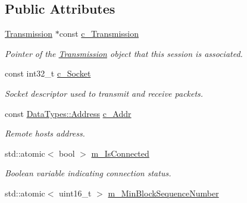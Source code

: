 \subsection*{Public Attributes}
\begin{DoxyCompactItemize}
\item 
\hyperlink{class_network_coding_1_1_transmission}{Transmission} $\ast$const \hyperlink{class_network_coding_1_1_transmission_session_a76808b9fb4d31f1c471ef313e50aff54}{c\+\_\+\+Transmission}\hypertarget{class_network_coding_1_1_transmission_session_a76808b9fb4d31f1c471ef313e50aff54}{}\label{class_network_coding_1_1_transmission_session_a76808b9fb4d31f1c471ef313e50aff54}

\begin{DoxyCompactList}\small\item\em Pointer of the \hyperlink{class_network_coding_1_1_transmission}{Transmission} object that this session is associated. \end{DoxyCompactList}\item 
const int32\+\_\+t \hyperlink{class_network_coding_1_1_transmission_session_a9d0373f0889c3f9ed0cead43c8cfefa9}{c\+\_\+\+Socket}\hypertarget{class_network_coding_1_1_transmission_session_a9d0373f0889c3f9ed0cead43c8cfefa9}{}\label{class_network_coding_1_1_transmission_session_a9d0373f0889c3f9ed0cead43c8cfefa9}

\begin{DoxyCompactList}\small\item\em Socket descriptor used to transmit and receive packets. \end{DoxyCompactList}\item 
const \hyperlink{class_network_coding_1_1_data_types_1_1_address}{Data\+Types\+::\+Address} \hyperlink{class_network_coding_1_1_transmission_session_a7ab84397c986b771ff4332746d9d948a}{c\+\_\+\+Addr}
\begin{DoxyCompactList}\small\item\em Remote host\textquotesingle{}s address. \end{DoxyCompactList}\item 
std\+::atomic$<$ bool $>$ \hyperlink{class_network_coding_1_1_transmission_session_aa12eab14f68b6e4dc5e2de25ff017282}{m\+\_\+\+Is\+Connected}\hypertarget{class_network_coding_1_1_transmission_session_aa12eab14f68b6e4dc5e2de25ff017282}{}\label{class_network_coding_1_1_transmission_session_aa12eab14f68b6e4dc5e2de25ff017282}

\begin{DoxyCompactList}\small\item\em Boolean variable indicating connection status. \end{DoxyCompactList}\item 
std\+::atomic$<$ uint16\+\_\+t $>$ \hyperlink{class_network_coding_1_1_transmission_session_a3c5449f03555c74ccff2e4d0b99c13d9}{m\+\_\+\+Min\+Block\+Sequence\+Number}\hypertarget{class_network_coding_1_1_transmission_session_a3c5449f03555c74ccff2e4d0b99c13d9}{}\label{class_network_coding_1_1_transmission_session_a3c5449f03555c74ccff2e4d0b99c13d9}


\end{DoxyCompactItemize}
